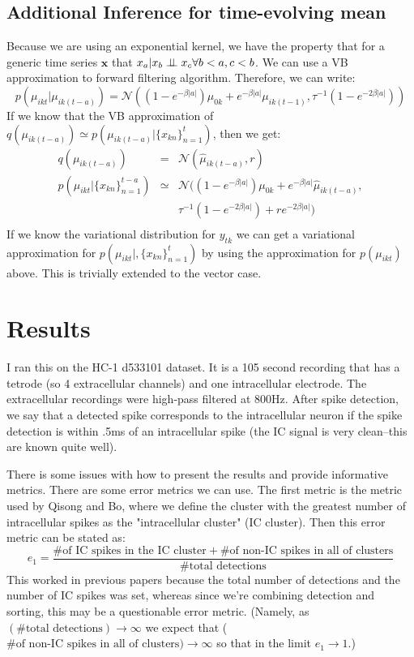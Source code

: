 \documentclass{article} %
\newcommand{\beq}{\begin{equation}}
\newcommand{\eeq}{\end{equation}}
\newcommand{\beqs}{\begin{eqnarray}}
\newcommand{\eeqs}{\end{eqnarray}}
\newcommand{\xv}{\boldsymbol{x}}
\begin{document}
\subsection{Additional Inference for time-evolving mean}
Because we are using an exponential kernel, we have the property that for a generic time series $\xv$ that $x_{a}|x_b \perp\hspace{-5pt}\perp x_{c}\forall b<a, c<b$.  We can use a VB approximation to forward filtering algorithm.  Therefore, we can write:
\beq
p(\mu_{ikt}|\mu_{ik(t-a)})= \mathcal{N}\left((1-e^{-\beta|a|})\mu_{0k}+e^{-\beta|a|}\mu_{ik(t-1)},\tau^{-1}(1-e^{-2\beta|a|})\right)
\eeq
If we know that the VB approximation of $q(\mu_{ik(t-a)})\simeq p(\mu_{ik(t-a)}|\{x_{kn}\}_{n=1}^{t})$, then we get:
\beqs
q(\mu_{ik(t-a)})&=&\mathcal N(\hat{\mu}_{ik(t-a)},r)\\
p(\mu_{ikt}|\{x_{kn}\}_{n=1}^{t-a})&\simeq&\mathcal{N}\big((1-e^{-\beta|a|})\mu_{0k}+e^{-\beta|a|}\hat{\mu}_{ik(t-a)},\nonumber\\
&&\tau^{-1}(1-e^{-2\beta|a|})+r e^{-2\beta|a|}\Big)\\
\eeqs
If we know the variational distribution for $y_{tk}$ we can get a variational approximation for $p(\mu_{ikt}|,\{x_{kn}\}_{n=1}^{t})$ by using the approximation for $p(\mu_{ikt})$ above.  This is trivially extended to the vector case.
\section{Results}
I ran this on the HC-1 d533101 dataset.  It is a 105 second recording that has a tetrode (so 4 extracellular channels) and one intracellular electrode.   The extracellular recordings were high-pass filtered at 800Hz.  After spike detection, we say that a detected spike corresponds to the intracellular neuron if the spike detection is within .5ms of an intracellular spike (the IC signal is very clean--this are known quite well).

There is some issues with how to present the results and provide informative metrics.  There are some error metrics we can use.  The first metric is the metric used by Qisong and Bo, where we define the cluster with the greatest number of intracellular spikes as the "intracellular cluster" (IC cluster). Then this error metric can be stated as:
\beq
e_1=\frac{\#\text{of IC spikes in the IC cluster}+\#\text{of non-IC spikes in all of clusters}}{\# \text{total detections}}
\eeq
This worked in previous papers because the total number of detections and the number of IC spikes was set, whereas since we're combining detection and sorting, this may be a questionable error metric.  (Namely, as  $(\# \text{total detections})\rightarrow\infty$ we expect that ($\#\text{of non-IC spikes in all of clusters})\rightarrow\infty$ so that in the limit $e_1\rightarrow1$.)
\end{document}
